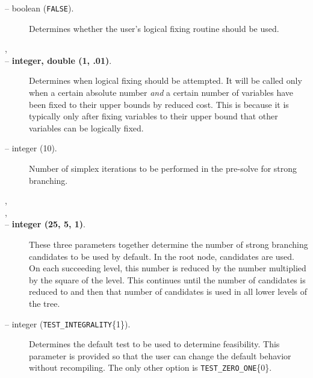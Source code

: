 \begin{description}
\item[ -- boolean ({\tt FALSE}).] 
Determines whether the user's logical fixing routine should be used.

\item[,]
\item[ -- 
{\bf integer, double (1, .01)}.]
Determines when logical fixing should be attempted. It will be called
only when a certain absolute number {\em and} a certain number of variables
have been fixed to their upper bounds by reduced cost. This is because
it is typically only after fixing variables to their upper bound that
other variables can be logically fixed.

\label{strong_branching}
\item[ -- integer (10).] 
Number of simplex iterations to be performed in the pre-solve for
strong branching.

\item[,]
\item[,]
\item[ --
{\bf integer (25, 5, 1)}.]
These three parameters together determine the number of strong
branching candidates to be used by default. In the root node,
 candidates are used. On each
succeeding level, this number is reduced by the number 
 multiplied by the square of the level.
This continues until the number of candidates is reduced to 
 and then that number of candidates
is used in all lower levels of the tree.

\item[ -- integer ({\tt TEST\_INTEGRALITY}\{1\}).]
Determines the default test to be used to determine feasibility. This
parameter is provided so that the user can change the default behavior
without recompiling. The only other option is {\tt TEST\_ZERO\_ONE}\{0\}.


\end{description}
